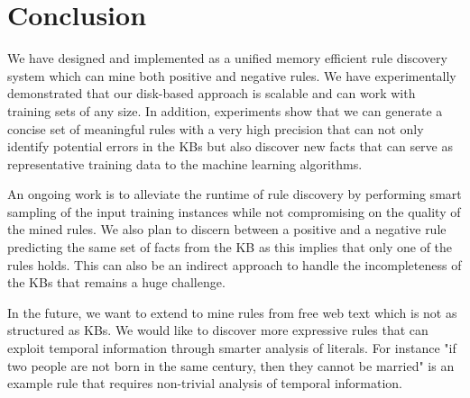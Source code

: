 \section{Conclusion}

We have designed and implemented \krd as a unified memory efficient rule discovery system which can mine both positive and negative rules. We have experimentally demonstrated that our disk-based approach is scalable and can work with training sets of any size. In addition, experiments show that we can generate a concise set of meaningful rules with a very high precision that can not only identify potential errors in the KBs but also discover new facts that can serve as representative training data to the machine learning algorithms.

An ongoing work is to alleviate the runtime of rule discovery by performing smart sampling of the input training instances while not compromising on the quality of the mined rules. We also plan to discern between a positive and a negative rule predicting the same set of facts from the KB as this implies that only one of the rules holds. This can also be an indirect approach to handle the incompleteness of the KBs that remains a huge challenge.

In the future, we want to extend \krd to mine rules from free web text which is not as structured as KBs. We would like to discover more expressive rules that can exploit temporal information through smarter analysis of literals. For instance "if two people are not born in the same century, then they cannot be married" is an example rule that requires non-trivial analysis of temporal information. 


